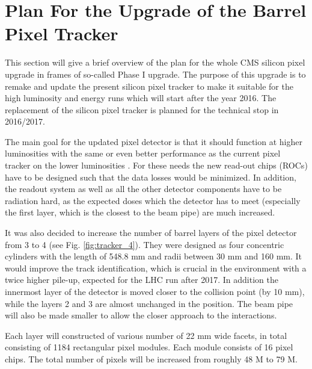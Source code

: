 \section{Plan For the Upgrade of the Barrel Pixel Tracker}

This section will give a brief overview of the plan for the whole CMS silicon pixel upgrade in frames of so-called
Phase I upgrade. The purpose of this upgrade is to remake and update the present silicon pixel tracker to make it 
suitable for the high luminosity and energy runs which will start after the year 2016. The replacement of the silicon
pixel tracker is planned for the technical stop in 2016/2017. 

The main goal for the updated pixel detector is that it should function at higher luminosities with the same or even
better performance as the current pixel tracker on the lower luminosities \cite{CMS:2012sda}. For these needs the new read-out chips
(ROCs) have to be designed such that the data losses would be minimized. In addition, the readout system as well as all
the other detector components have to be radiation hard, as the expected doses which the detector has to meet (especially
the first layer, which is the closest to the beam pipe) are much increased.

It was also decided to increase the number of barrel layers of the pixel detector from 3 to 4 (see Fig. \ref{fig:tracker_4}).
They were designed as four concentric cylinders with the length of 548.8 mm and radii between 30 mm and 160 mm.
It would improve the track identification, which is crucial in the environment with a twice higher pile-up, expected for the 
LHC run after 2017. In addition the innermost layer of the detector is moved closer to the collision point (by 10 mm), while
the layers 2 and 3 are almost unchanged in the position. The beam pipe
will also be made smaller to allow the closer approach to the interactions.

Each layer will constructed of various number of 22 mm wide facets, in total consisting of 1184 rectangular pixel modules. Each module
consists of 16 pixel chips. The total number of pixels will be increased from roughly 48 M to 79 M.


